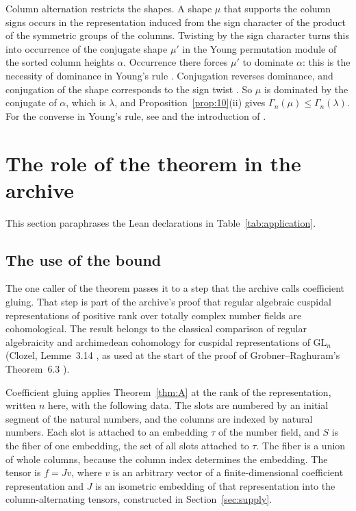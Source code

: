 \documentclass[11pt]{amsart}
\theoremstyle{definition}
\theoremstyle{remark}
\begin{document}
Column alternation restricts the shapes. A shape \(\mu\) that supports the
column signs occurs in the representation induced from the sign character of
the product of the symmetric groups of the columns. Twisting by the sign
character turns this into occurrence of the conjugate shape \(\mu'\) in the
Young permutation module of the sorted column heights \(\alpha\). Occurrence
there forces \(\mu'\) to dominate \(\alpha\): this is the necessity of
dominance in Young's rule \cite[Theorem~6.5 and \S 6.9]{HazewinkelMartin}.
Conjugation reverses dominance, and conjugation of the shape corresponds to
the sign twist \cite[I.1, (1.11), and I.7, Example~2]{Macdonald}. So \(\mu\)
is dominated by the conjugate of \(\alpha\), which is \(\lambda\), and
Proposition~\ref{prop:10}(ii) gives \(\Gamma_n(\mu)\le\Gamma_n(\lambda)\).
For the converse in Young's rule, see
\cite[\S 6.10]{HazewinkelMartin} and the introduction of
\cite{HazewinkelVorst}.

\section{The role of the theorem in the archive}\label{sec:role}

This section paraphrases the Lean declarations in Table~\ref{tab:application}.

\subsection{The use of the bound}

The one caller of the theorem passes it to a step that the archive calls
coefficient gluing. That step is part of the archive's proof that regular
algebraic cuspidal representations of positive rank over totally complex
number fields are cohomological. The result belongs to the classical
comparison of regular algebraicity and archimedean cohomology for cuspidal
representations of \(\mathrm{GL}_n\) (Clozel, Lemme~3.14 \cite{Clozel}, as
used at the start of the proof of Grobner--Raghuram's
Theorem~6.3 \cite{GrobnerRaghuram}).

Coefficient gluing applies Theorem~\ref{thm:A} at the rank of the
representation, written \(n\) here, with the following data. The slots are
numbered by an initial segment of the natural numbers, and the columns are
indexed by natural numbers. Each slot is attached to an embedding \(\tau\)
of the number field, and \(S\) is the fiber of one embedding, the set of all
slots attached to \(\tau\). The fiber is a union of whole columns, because
the column index determines the embedding. The tensor is \(f=Jv\), where
\(v\) is an arbitrary vector of a finite-dimensional coefficient
representation and \(J\) is an isometric embedding of that representation
into the column-alternating tensors, constructed in
Section~\ref{sec:supply}.
\end{document}
